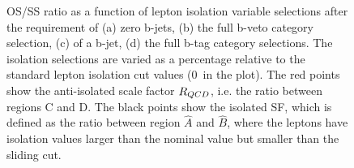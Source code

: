 \begin{figure}[h!]
\begin{center}
\end{center}
	\caption{OS/SS ratio as a function of lepton isolation variable selections after the requirement of (a) zero b-jets, (b) the full b-veto category selection, 
	(c) of a b-jet, (d) the full b-tag category selections. The isolation selections are varied as a percentage relative to
	the standard lepton isolation cut values (0~in the plot). 
	The red points show the anti-isolated scale factor $R_{QCD}$, i.e. the ratio between regions C and D.
	 The black points show the isolated SF, which is defined as the ratio between region $\hat{A}$ and $\hat{B}$, 
	 where the leptons have isolation values larger than the nominal value but smaller
	 than the sliding cut.
	 }
\end{figure}


